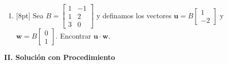 \documentclass[11pt]{article}
\begin{document}
\begin{enumerate}
\noindent (V)\ \dotfill\ (F).\ \dotfill

\item{}[8pt] Sea $B = \begin{bmatrix}1&-1\\1&2\\3&0\end{bmatrix}$ y definamos los vectores $\mathbf{u} = B\begin{bmatrix}1\\-2\end{bmatrix}$ y $\mathbf{w} = B\begin{bmatrix}0\\1\end{bmatrix}$. Encontrar $\mathbf{u}\cdot\mathbf{w}$.

\vspace{4pt}
\end{enumerate}

\vspace{6pt}
\begin{center}\textbf{II. Solución con Procedimiento}\end{center}
\end{document}
